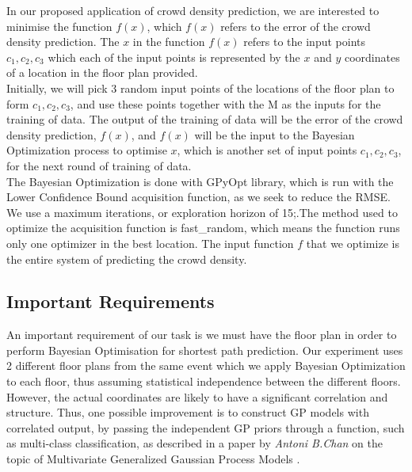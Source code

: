 \documentclass[letterpaper]{article}
\begin{document}
In our proposed application of crowd density prediction, we are interested to minimise the function $f(x)$, which $f(x)$ refers to the error of the crowd density prediction. The $x$ in the function $f(x)$ refers to the input points $c_1, c_2, c_3$ which each of the input points is represented by the $x$ and $y$ coordinates of a location in the floor plan provided.  \\

Initially, we will pick 3 random input points of the locations of the floor plan to form $c_1, c_2, c_3$, and use these points together with the M as the inputs for the training of data. The output of the training of data will be the error of the crowd density prediction, $f(x)$, and $f(x)$ will be the input to the Bayesian Optimization process to optimise $x$, which is another set of input points $c_1, c_2, c_3$, for the next round of training of data. \\

The Bayesian Optimization is done with GPyOpt library, which is run with the Lower Confidence Bound acquisition function, as we seek to reduce the RMSE. We use a maximum iterations, or exploration horizon of 15;.The method used to optimize the acquisition function is fast\_random, which means the function runs only one optimizer in the best location. The input function $f$ that we optimize is the entire system of predicting the crowd density.

\subsection{Important Requirements}

An important requirement of our task is we must have the floor plan in order to perform Bayesian Optimisation for shortest path prediction. Our experiment uses 2 different floor plans from the same event which we apply Bayesian Optimization to each floor, thus assuming statistical independence between the different floors.\\

However, the actual coordinates are likely to have a significant correlation and structure. Thus, one possible improvement is to construct GP models with correlated output, by passing the independent GP priors through a function, such as multi-class classification, as described in a paper by {\it Antoni B.Chan} on the topic of Multivariate Generalized Gaussian Process Models \cite{achan}. \\
\end{document}
